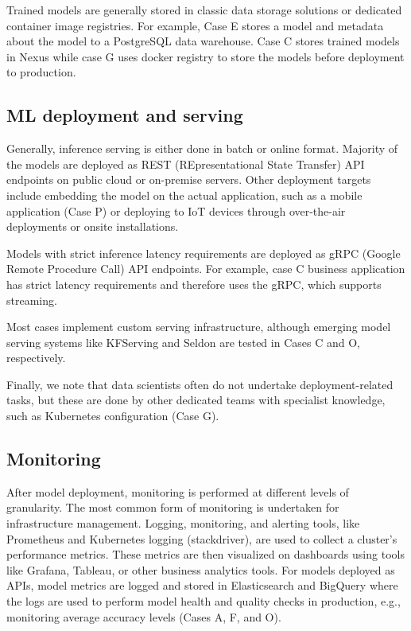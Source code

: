 \documentclass{IEEEcsmag}
\begin{document}
Trained models are generally stored in classic data storage solutions or dedicated container image registries. For example, Case E stores a model and metadata about the model to a PostgreSQL data warehouse. Case C stores trained models in Nexus while case G uses docker registry to store the models before deployment to production.



\subsection{ML deployment and serving}
Generally, inference serving is either done in batch or online format. Majority of the models are deployed as REST (REpresentational State Transfer) API endpoints on public cloud or on-premise servers. Other deployment targets include embedding the model on the actual application, such as a mobile application (Case P) or deploying to IoT devices through over-the-air deployments or onsite installations.

Models with strict inference latency requirements are deployed as gRPC (Google Remote Procedure Call) API endpoints. For example, case C business application has strict latency requirements and therefore uses the gRPC, which supports streaming.

Most cases implement custom serving infrastructure, although emerging model serving systems like KFServing and Seldon are tested in Cases C and O, respectively. 

Finally, we note that data scientists often do not undertake deployment-related tasks, but these are done by other dedicated teams with specialist knowledge, such as Kubernetes configuration (Case G).

\subsection{Monitoring}
After model deployment, monitoring is performed at different levels of granularity. The most common form of monitoring is undertaken for infrastructure management. Logging, monitoring, and alerting tools, like Prometheus and Kubernetes logging (stackdriver), are used to collect a cluster's performance metrics. These metrics are then visualized on dashboards using tools like Grafana, Tableau, or other business analytics tools. For models deployed as APIs, model metrics are logged and stored in Elasticsearch and BigQuery where the logs are used to perform model health and quality checks in production, e.g., monitoring average accuracy levels (Cases A, F, and O).
\end{document}
